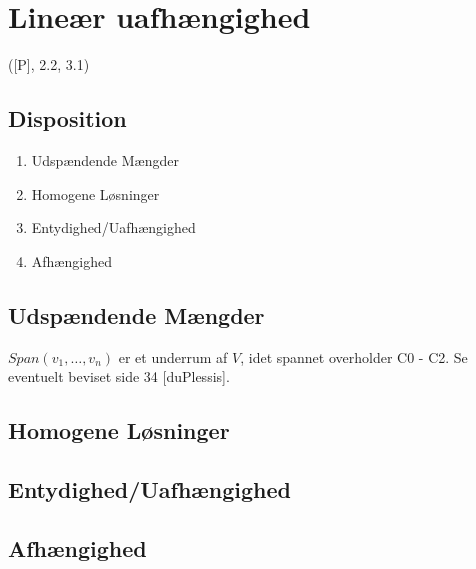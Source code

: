 \newpage
\chapter{Lineær uafhængighed}
([P], 2.2, 3.1)

\section*{Disposition}
\begin{enumerate}
	\item Udspændende Mængder
	\item Homogene Løsninger
	\item Entydighed/Uafhængighed
	\item Afhængighed
\end{enumerate}

\section{Udspændende Mængder}


$Span(v_1,\dots,v_n)$ er et underrum af $V$, idet spannet overholder C0 - C2.
Se eventuelt beviset side 34 [duPlessis].

\section{Homogene Løsninger}
\hypertarget{1.2.13}{}


\section{Entydighed/Uafhængighed}




\section{Afhængighed}
\hypertarget{2.2.15}{}

